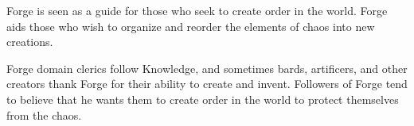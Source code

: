 Forge is seen as a guide for those who seek to create order in the world.
Forge aids those who wish to organize and reorder the elements of chaos into new creations.

Forge domain clerics follow Knowledge, and sometimes bards, artificers, and other creators thank Forge for their ability to create and invent.
Followers of Forge tend to believe that he wants them to create order in the world to protect themselves from the chaos.
